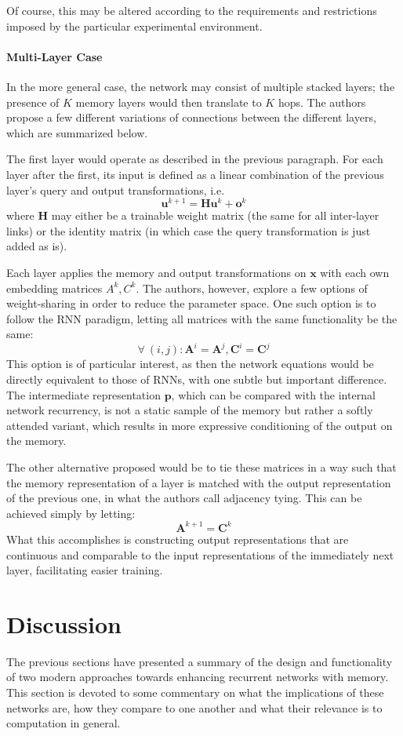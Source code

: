 \documentclass[]{article}
\begin{document}
Of course, this may be altered according to the requirements and restrictions imposed by the particular experimental environment. 

\paragraph{Multi-Layer Case}
In the more general case, the network may consist of multiple stacked layers; the presence of $K$ memory layers would then translate to $K$ hops. The authors propose a few different variations of connections between the different layers, which are summarized below. 

The first layer would operate as described in the previous paragraph. For each layer after the first, its input is defined as a linear combination of the previous layer's query and output transformations, i.e.
\[
\tag{Next Query}
\pmb{u}^{k+1} = \pmb{H}\pmb{u}^{k} + \pmb{o}^k 
\]
where $\pmb{H}$ may either be a trainable weight matrix (the same for all inter-layer links) or the identity matrix (in which case the query transformation is just added as is).

Each layer applies the memory and output transformations on $\pmb{x}$ with each own embedding matrices $A^k, C^k$. The authors, however, explore a few options of weight-sharing in order to reduce the parameter space. One such option is to follow the RNN paradigm, letting all matrices with the same functionality be the same:
\[
\tag{RNN-Tying}
\forall \ (i,j): \pmb{A}^i = \pmb{A}^j, \pmb{C}^i = \pmb{C}^j
\]
This option is of particular interest, as then the network equations would be directly equivalent to those of RNNs, with one subtle but important difference. The intermediate representation $\pmb{p}$, which can be compared with the internal network recurrency, is not a static sample of the memory but rather a softly attended variant, which results in more expressive conditioning of the output on the memory. 

The other alternative proposed would be to tie these matrices in a way such that the memory representation of a layer is matched with the output representation of the previous one, in what the authors call adjacency tying. This can be achieved simply by letting:
\[
\tag{Adjacency Tying}
\pmb{A}^{k+1} = \pmb{C}^k
\]
What this accomplishes is constructing output representations that are continuous and comparable to the input representations of the immediately next layer, facilitating easier training.

\section{Discussion}
\label{Comp}
The previous sections have presented a summary of the design and functionality of two modern approaches towards enhancing recurrent networks with memory. This section is devoted to some commentary on what the implications of these networks are, how they compare to one another and what their relevance is to computation in general.
\end{document}
